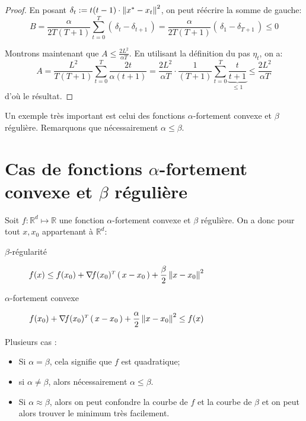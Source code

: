 \documentclass[11pt]{article}
\newcommand{\transpose}[1]{\ensuremath{#1^{\scriptscriptstyle T}}}
\newcommand{\dotpourvariable}{\:\cdot\:}
\newcommand{\ifempty}[3]{\ifx\hfuzz#1\hfuzz #2 \else #3\fi}
\newcommand{\norme}[1]{\left\lVert\ifempty{#1}{\dotpourvariable}{#1}\right\rVert}
\newcommand{\prt}[1]{\left( \, #1  \, \right)}
\newcommand{\R}{\mathbb{R}} %
\begin{document}
\begin{proof}
En posant $\delta_t := t(t-1) \cdot \norme{x^{*}-x_t}^2$, on peut réécrire la somme
 de gauche:
\begin{equation*}
B= \frac{\alpha}{2T(T+1)} \sum_{t=0}^T \prt{\delta_t-\delta_{t+1}}
=\frac{\alpha}{2T(T+1)} \prt{\delta_1-\delta_{T+1}}
\leq 0
\end{equation*}

Montrons maintenant que $A \leq \frac{2 L^2}{\alpha T}$. En utilisant la définition
 du pas $\eta_t$, on a:
 \begin{equation*}
   A= \frac{L^2}{T(T+1)} \sum_{t=0}^T \frac{2t}{\alpha (t+1)}
   = \frac{2L^2}{\alpha T} \cdot  \frac{1}{(T+1)}\sum_{t=0}^T \underbrace{\frac{t}{t+1}}_{\leq 1} \leq \frac{2L^2}{\alpha T}
 \end{equation*}
d'où le résultat.
\end{proof}

Un exemple très important est celui des fonctions $\alpha$-fortement convexe et
 $\beta$ régulière. Remarquons que nécessairement $\alpha \leq \beta$.

 \section{Cas de fonctions $\alpha$-fortement convexe et
  $\beta$ régulière}

  Soit $f: \R^d \mapsto \R$ une fonction $\alpha$-fortement convexe et
   $\beta$ régulière. On a donc pour tout $x, x_0$ appartenant à $\R^d$:
   \begin{description}
     \item[$\beta$-régularité] $\displaystyle f(x) \leq f(x_0)+ \transpose{\nabla\! f(x_0)}\prt{x-x_0}+ \frac{\beta}{2}\norme{x-x_0}^2$
     \item[$\alpha$-fortement convexe] $\displaystyle f(x_0)+ \transpose{\nabla\! f(x_0)}\prt{x-x_0}+ \frac{\alpha}{2}\norme{x-x_0}^2 \leq  f(x) $
   \end{description}

   Plusieurs cas :
   \begin{itemize}
     \item Si $\alpha=\beta$, cela signifie que $f$ est quadratique;
     \item si $\alpha \neq \beta$, alors nécessairement $\alpha \leq \beta$.
     \item Si $\alpha \approx \beta$, alors on peut confondre la courbe de $f$ et
     la courbe de $\beta$ et on peut alors trouver le minimum très facilement.
   \end{itemize}
\end{document}
